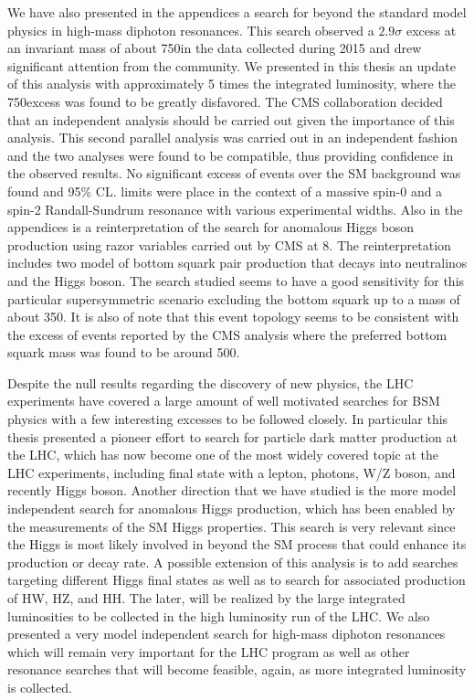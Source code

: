 We have also presented in the appendices a search for beyond the
standard model physics in high-mass diphoton resonances. This search
observed a $2.9\sigma$ excess at an invariant mass of about 750\GeV in the data collected during 2015 and
drew significant attention from the community. We presented in this
thesis an update of this analysis with approximately 5 times the
integrated luminosity, where the 750\GeV excess was found to be
greatly disfavored. The CMS collaboration decided that an independent
analysis should be carried out given the importance of this
analysis. This second parallel analysis was carried out in an
independent fashion and the two analyses were found to be compatible,
thus providing confidence in the observed results. No significant
excess of events over the SM background was found and 95\% CL. limits
were place in the context of a massive spin-0 and a spin-2
Randall-Sundrum resonance with various experimental widths.
Also in the appendices is a reinterpretation of the search for
anomalous Higgs boson production using razor variables carried out by
CMS at 8\TeV. The reinterpretation includes two model of bottom squark
pair production that decays into neutralinos and the Higgs boson. The
search studied seems to have a good sensitivity for this particular
supersymmetric scenario excluding the bottom squark up to a mass of
about 350\GeV. It is also of note that this event topology seems to be
consistent with the excess of events reported by the CMS analysis
where the preferred bottom squark mass was found to be around 500\GeV.

Despite the null results regarding the discovery of new physics, the
LHC experiments have covered a large amount of well motivated searches for
BSM physics with a few interesting excesses to be followed closely. In particular this thesis presented a pioneer effort to search
for particle dark matter production at the LHC, which has now become
one of the most widely covered topic at the LHC experiments, including
final state with a lepton, photons, W/Z boson, and recently Higgs
boson. Another direction that we have studied is the more model
independent search for anomalous Higgs production, which has been
enabled by the measurements of the SM Higgs properties. This search is
very relevant since the Higgs is most likely involved in beyond the SM
process that could enhance its production or decay rate. A possible
extension of this analysis is to add searches targeting different
Higgs final states as well as to search for associated production of
HW, HZ, and HH. The later, will be realized by the large integrated
luminosities to be collected in the high luminosity run of the LHC. We
also presented a very model independent search for high-mass diphoton
resonances which will remain very important for the LHC program as well
as other resonance searches that will become feasible, again, as more
integrated luminosity is collected. 

